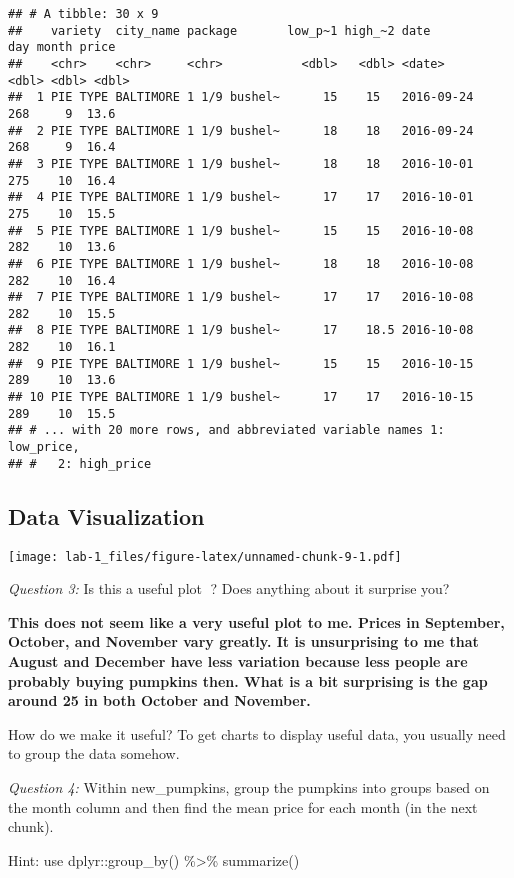 \documentclass[
]{article}
\begin{document}
\begin{verbatim}
## # A tibble: 30 x 9
##    variety  city_name package       low_p~1 high_~2 date         day month price
##    <chr>    <chr>     <chr>           <dbl>   <dbl> <date>     <dbl> <dbl> <dbl>
##  1 PIE TYPE BALTIMORE 1 1/9 bushel~      15    15   2016-09-24   268     9  13.6
##  2 PIE TYPE BALTIMORE 1 1/9 bushel~      18    18   2016-09-24   268     9  16.4
##  3 PIE TYPE BALTIMORE 1 1/9 bushel~      18    18   2016-10-01   275    10  16.4
##  4 PIE TYPE BALTIMORE 1 1/9 bushel~      17    17   2016-10-01   275    10  15.5
##  5 PIE TYPE BALTIMORE 1 1/9 bushel~      15    15   2016-10-08   282    10  13.6
##  6 PIE TYPE BALTIMORE 1 1/9 bushel~      18    18   2016-10-08   282    10  16.4
##  7 PIE TYPE BALTIMORE 1 1/9 bushel~      17    17   2016-10-08   282    10  15.5
##  8 PIE TYPE BALTIMORE 1 1/9 bushel~      17    18.5 2016-10-08   282    10  16.1
##  9 PIE TYPE BALTIMORE 1 1/9 bushel~      15    15   2016-10-15   289    10  13.6
## 10 PIE TYPE BALTIMORE 1 1/9 bushel~      17    17   2016-10-15   289    10  15.5
## # ... with 20 more rows, and abbreviated variable names 1: low_price,
## #   2: high_price
\end{verbatim}

\hypertarget{data-visualization}{%
\subsection{Data Visualization}\label{data-visualization}}

\texttt{[image: lab-1\_files/figure-latex/unnamed-chunk-9-1.pdf]}

\emph{Question 3:} Is this a useful plot 🤷? Does anything about it
surprise you?

\textbf{This does not seem like a very useful plot to me. Prices in
September, October, and November vary greatly. It is unsurprising to me
that August and December have less variation because less people are
probably buying pumpkins then. What is a bit surprising is the gap
around 25 in both October and November.}

How do we make it useful? To get charts to display useful data, you
usually need to group the data somehow.

\emph{Question 4:} Within new\_pumpkins, group the pumpkins into groups
based on the month column and then find the mean price for each month
(in the next chunk).

Hint: use dplyr::group\_by() \%\textgreater\% summarize()
\end{document}
